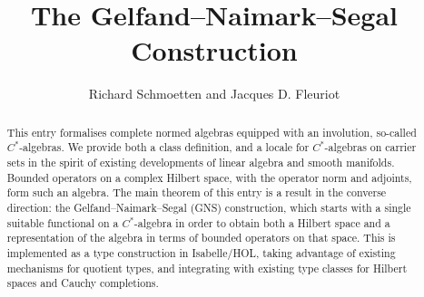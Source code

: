 \documentclass[11pt,a4paper]{article}
\theoremstyle{definition}
\begin{document}
\title{The Gelfand--Naimark--Segal Construction}
\author{Richard Schmoetten and Jacques D. Fleuriot}
\maketitle

\begin{abstract}
This entry formalises complete normed algebras equipped with an involution, so-called $C^*$-algebras.
We provide both a class definition, and a locale for $C^*$-algebras on carrier sets in the spirit of existing developments of linear algebra and smooth manifolds.
Bounded operators on a complex Hilbert space, with the operator norm and adjoints, form such an algebra.
The main theorem of this entry is a result in the converse direction: the Gelfand--Naimark--Segal (GNS) construction, which starts with a single suitable functional on a $C^*$-algebra in order to obtain both a Hilbert space and a representation of the algebra in terms of bounded operators on that space.
This is implemented as a type construction in Isabelle/HOL, taking advantage of existing mechanisms for quotient types, and integrating with existing type classes for Hilbert spaces and Cauchy completions.
\end{abstract}

\tableofcontents





\end{document}
